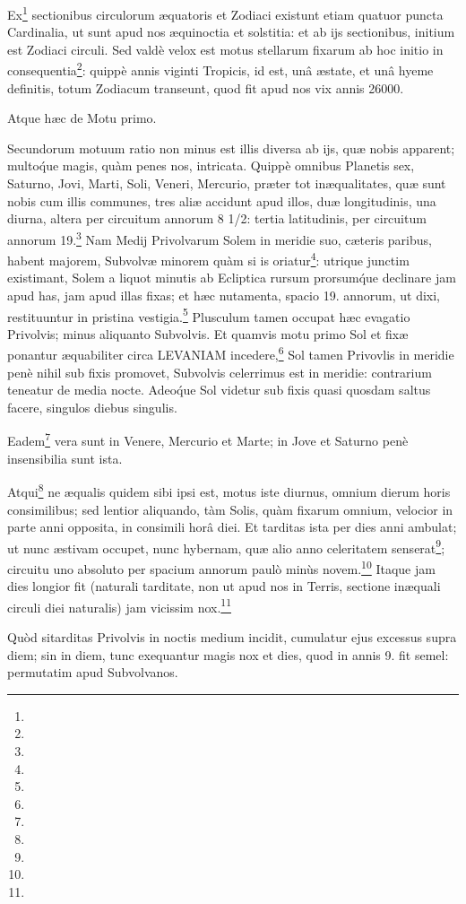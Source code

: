 \documentclass[a4paper, 11pt, oneside, polutonikogreek, german]{article}
\begin{document}
Ex\footnote{} sectionibus circulorum æquatoris et Zodiaci existunt etiam quatuor puncta Cardinalia, ut sunt apud nos æquinoctia et solstitia: et ab ijs sectionibus, initium est Zodiaci circuli. Sed valdè velox est motus stellarum fixarum ab hoc initio in consequentia\footnote{}: quippè annis viginti Tropicis, id est, unâ æstate, et unâ hyeme definitis, totum Zodiacum transeunt, quod fit apud nos vix annis 26000.

Atque hæc de Motu primo.

Secundorum motuum ratio non minus est illis diversa ab ijs, quæ nobis apparent; multo\'que magis, quàm penes nos, intricata. Quippè omnibus Planetis sex, Saturno, Jovi, Marti, Soli, Veneri, Mercurio, præter tot inæqualitates, quæ sunt nobis cum illis communes, tres aliæ accidunt apud illos, duæ longitudinis, una diurna, altera per circuitum annorum 8 1/2: tertia latitudinis, per circuitum annorum 19.\footnote{} Nam Medij Privolvarum Solem in meridie suo, cæteris paribus, habent majorem, Subvolvæ minorem quàm si is oriatur\footnote{}: utrique junctim existimant, Solem a liquot minutis ab Ecliptica rursum prorsum\'que declinare jam apud has, jam apud illas fixas; et hæc nutamenta, spacio 19. annorum, ut dixi, restituuntur in pristina vestigia.\footnote{} Plusculum tamen occupat hæc evagatio Privolvis; minus aliquanto Subvolvis. Et quamvis motu primo Sol et fixæ ponantur æquabiliter circa LEVANIAM incedere,\footnote{} Sol tamen Privovlis in meridie penè nihil sub fixis promovet, Subvolvis celerrimus est in meridie: contrarium teneatur de media nocte. Adeo\'que Sol videtur sub fixis quasi quosdam saltus facere, singulos diebus singulis.

Eadem\footnote{} vera sunt in Venere, Mercurio et Marte; in Jove et Saturno penè insensibilia sunt ista.

Atqui\footnote{} ne æqualis quidem sibi ipsi est, motus iste diurnus, omnium dierum horis consimilibus; sed lentior aliquando, tàm Solis, quàm fixarum omnium, velocior in parte anni opposita, in consimili horâ diei. Et tarditas ista per dies anni ambulat; ut nunc æstivam occupet, nunc hybernam, quæ alio anno celeritatem senserat\footnote{}; circuitu uno absoluto per spacium annorum paulò minùs novem.\footnote{} Itaque jam dies longior fit (naturali tarditate, non ut apud nos in Terris, sectione inæquali circuli diei naturalis) jam vicissim nox.\footnote{}

Quòd sitarditas Privolvis in noctis medium incidit, cumulatur ejus excessus supra diem; sin in diem, tunc exequantur magis nox et dies, quod in annis 9. fit semel: permutatim apud Subvolvanos.
\end{document}
